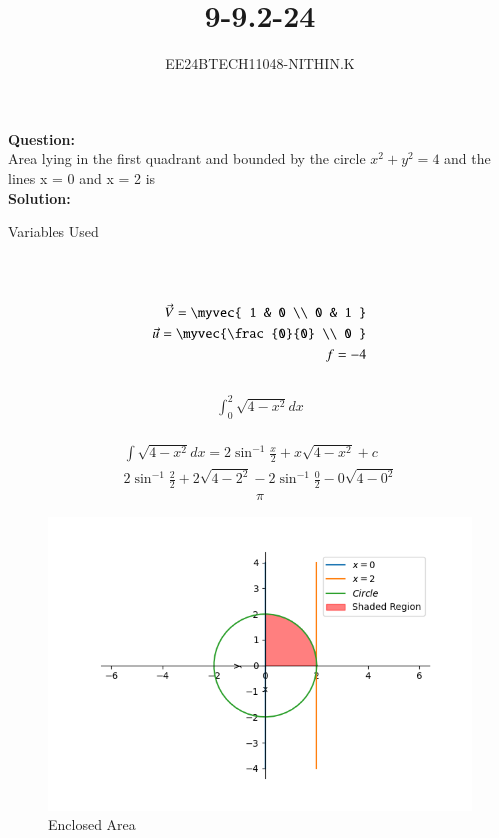 \documentclass[journal]{IEEEtran}
\begin{document}


\title{9-9.2-24}
\author{EE24BTECH11048-NITHIN.K}
{\let\newpage\relax\maketitle}

\textbf{Question:} \\
Area lying in the first quadrant and bounded by the circle $x^2 + y^2 = 4$ and the lines
x = 0 and x = 2 is \\
\textbf{Solution:} \\
\begin{table}[h!]
      \centering
      
      \caption{Variables Used}
\end{table}\\
 \\
\begin{align}
	\vec{V} = \myvec{ 1 & 0 \\
	0 & 1 } \\
	\vec{u} = \myvec{\frac{0}{0} \\
	0 } \\
	f = -4 \\
\end{align}
 \\
\begin{align}
	\int_{0}^{2}\sqrt{4 - x^2} dx
\end{align}
 \\
\begin{align}
	\int\sqrt{4 - x^2} dx = 2\sin^{-1}\frac{x}{2} + x\sqrt{4 - x^2} + c \\
	2\sin^{-1}\frac{2}{2} + 2\sqrt{4 - 2^2} - 2\sin^{-1}\frac{0}{2} - 0\sqrt{4 - 0^2}
\end{align}
\begin{align}
	\pi
\end{align}
\begin{figure}[h]
\centering
\includegraphics[width=0.7\linewidth]{figs/Figure_1.png}
\caption{Enclosed Area}
\end{figure}
\end{document}

